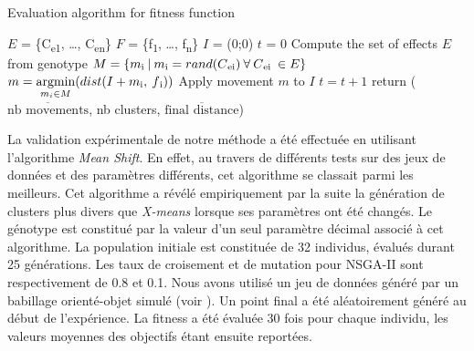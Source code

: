 \documentclass[draft]{llncs}
\newcommand{\textoverline}[1]{$\overline{\mbox{#1}}$}
\begin{document}
      \begin{algorithm}[H]
      \caption{Evaluation algorithm for fitness function}\label{euclid}
        \begin{algorithmic}[1]
          \State $E$ = \{C\textsubscript{e1}, \dots, C\textsubscript{en}\} 
          \State $F$ = \{f\textsubscript{1}, \dots, f\textsubscript{n}\} 
          \State $I$ = (0;0) 
          \State $t$ = 0 
          \State Compute the set of effects $E$ from genotype
                  \State $M = \{ m\textsubscript{i}\:|\:m\textsubscript{i} = rand(C\textsubscript{ei})\:\forall\:C\textsubscript{ei}\:\in E\}$
                  \State $m = \operatornamewithlimits{argmin}\limits_{m_i \in M}(dist(I+m\textsubscript{i},\:f\textsubscript{i}))$
                  \State Apply movement $m$ to $I$
                  \State $t = t + 1$
                \EndWhile
              \EndFor
            \EndFor
            \State return (\textoverline{nb movements}, nb clusters, \textoverline{final distance})
        \end{algorithmic}
      \end{algorithm}


La validation expérimentale de notre méthode a été effectuée en utilisant l'algorithme \textit{Mean Shift}.
En effet, au travers de différents tests sur des jeux de données et des paramètres différents, cet algorithme se classait parmi les meilleurs.
Cet algorithme a révélé empiriquement par la suite la génération de clusters plus divers que \textit{X-means} lorsque ses paramètres ont été changés.
Le génotype est constitué par la valeur d'un seul paramètre décimal associé à cet algorithme.
La population initiale est constituée de 32 individus, évalués durant 25 générations. Les taux de croisement et de mutation pour NSGA-II sont respectivement de 0.8 et 0.1. Nous avons utilisé un jeu de données généré par un babillage orienté-objet simulé (voir ).
Un point final a été aléatoirement généré au début de l'expérience. La fitness a été évaluée 30 fois pour chaque individu, les valeurs moyennes des objectifs étant ensuite reportées.
\end{document}
